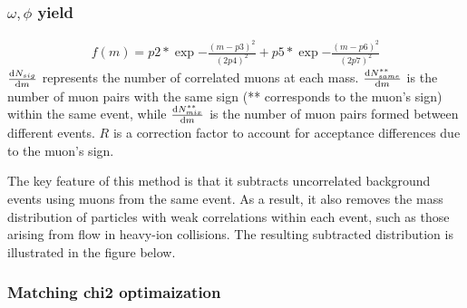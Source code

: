             \subsubsection{$\omega,\phi$ yield} 
            \begin{eqnarray}
            f(m)=p2*\exp{-\frac{(m-p3)^2}{(2p4)^2}}+p5*\exp{-\frac{(m-p6)^2}{(2p7)^2}}
            \end{eqnarray}
            \(\dv{N_{sig}}{m}\) represents the number of correlated muons at each mass. \(\dv{N_{same}^{**}}{m}\) is the number of muon pairs with the same sign (** corresponds to the muon's sign) within the same event, while \(\dv{N_{mix}^{**}}{m}\) is the number of muon pairs formed between different events. \(R\) is a correction factor to account for acceptance differences due to the muon's sign.

            The key feature of this method is that it subtracts uncorrelated background events using muons from the same event. As a result, it also removes the mass distribution of particles with weak correlations within each event, such as those arising from flow in heavy-ion collisions. The resulting subtracted distribution is illustrated in the figure below.

        \subsubsection{Matching chi2 optimaization}
       